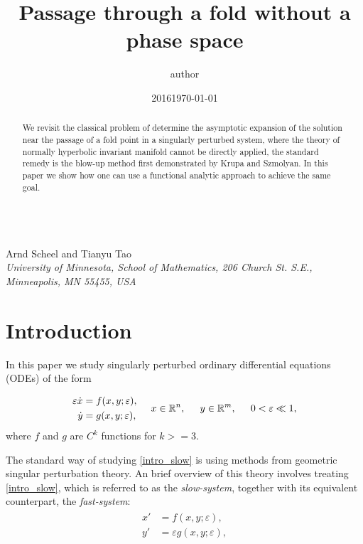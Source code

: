 \documentclass[letterpaper,11pt]{article}
\title{Passage through a fold without a phase space}
\author{author}
\date{2016}
\newcommand{\eps}{\varepsilon}
\numberwithin{equation}{section}
\theoremstyle{plain}
\begin{document}
\begin{center}

{\fontsize{17}{17}\selectfont{Alternatives to the blow-up method in singular perturbation problems}}\\[0.2in]
Arnd Scheel and Tianyu Tao\\
\textit{\footnotesize 
University of Minnesota, School of Mathematics,   206 Church St. S.E., Minneapolis, MN 55455, USA}
\date{\small \today} 
\vspace*{0.2in}
\end{center}

\begin{abstract}
\noindent We revisit the classical problem of determine the asymptotic expansion of the solution near the passage of a fold point in a singularly perturbed system, where the theory of normally hyperbolic invariant manifold cannot be directly applied, the standard remedy is the blow-up method first demonstrated by Krupa and Szmolyan. In this paper we show how one can use a functional analytic approach to achieve the same goal.
\end{abstract}

\section{Introduction}
In this paper we study singularly perturbed ordinary differential equations (ODEs) of the form

\begin{align}\label{intro_slow}
\begin{split}
\eps \dot{x} &=  f(x,y;\eps),\\
\dot{y } &=   g(x,y;\eps),   
\end{split}\hspace{0.2in} x\in \mathbb{R}^n, \hspace{0.2in} y \in \mathbb{R}^m, \hspace{0.2in} 0<\eps \ll 1,
\end{align}
where $f$ and $g$ are $C^k$ functions for $k>=3$.

The standard way of studying \eqref{intro_slow} is using methods from geometric singular perturbation theory. An brief overview of this theory involves treating \eqref{intro_slow}, which is referred to as the \textit{slow-system}, together with its  equivalent counterpart, the \textit{fast-system}:
\begin{align}\label{intro_fast}
\begin{split}
x' &=  f(x,y;\eps),\\
y' &=  \eps g(x,y;\eps),   
\end{split}
\end{align}
\end{document}
